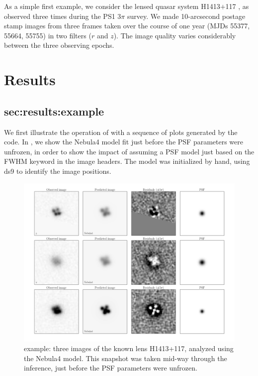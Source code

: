 \documentclass[useAMS,usenatbib]{mn2e}
\begin{document}
As a simple first example, we consider the lensed quasar system H1413$+$117
\citep{H1413}, as observed three times during the PS1 $3\pi$ survey. We 
made 10-arcsecond postage stamp images from three frames taken over the
course of one year (MJDs  55377, 55664, 55755) in two filters ($r$ and
$z$). The image quality varies considerably between the three observing
epochs.




\section{Results}
\label{sec:results}

\subsection{sec:results:example}

We first illustrate the operation of \LT with a sequence of plots generated
by the code. In , we show the Nebula4 model
fit just before the PSF parameters were unfrozen, in order to show the
impact of assuming a PSF model just based on the FWHM keyword in the image
headers. The model was initialized by hand, using ds9 to identify the image
positions.

\begin{figure}
\centerline{
\includegraphics[width=0.9\linewidth]{figs/H1413+117_10x10arcsec_progress-06_optimizing_Nebula4.png}}
\caption{\LT example: three images of the known lens H1413+117, analyzed using
the Nebula4 model. This snapshot was taken mid-way through the inference, just
before the PSF parameters were unfrozen.}
\label{fig:H1413example-progress}
\end{figure}
\end{document}
